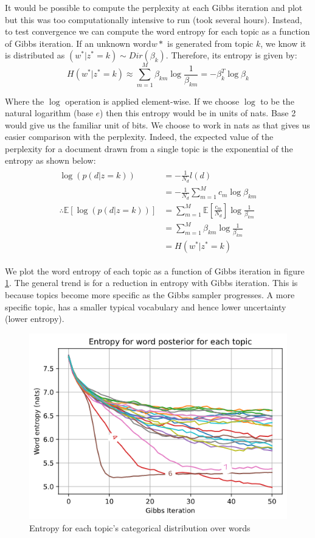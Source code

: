 \documentclass[]{article}
\newcommand{\figwidth}{0.4\linewidth}
\newcommand{\Expect}{\mathbb{E}}
\begin{document}
It would be possible to compute the perplexity at each Gibbs iteration and plot but this was too computationally intensive to run (took several hours). Instead, to test convergence we can compute the word entropy for each topic as a function of Gibbs iteration. If an unknown word$w*$ is generated from topic $k$, we know it is distributed as $(w^* | z^* = k) \sim Dir(\beta_k)$. Therefore, its entropy is given by:
%
\begin{equation}
	H(w^* | z^* = k) \approx \sum_{m=1}^{M} \beta_{km} \log \frac{1}{\beta_{km}} = - \beta_k^T \log \beta_k
\end{equation}

Where the $\log$ operation is applied element-wise. If we choose $\log$ to be the natural logarithm (base $e$) then this entropy would be in units of nats. Base 2 would give us the familiar unit of bits. We choose to work in nats as that gives us easier comparison with the perplexity. Indeed, the expected value of the perplexity for a document drawn from a single topic is the exponential of the entropy as shown below:
%
\begin{align}
\begin{split}
	\log(p(d|z=k)) &= - \frac{1}{N_d} l(d) \\
	&= - \frac{1}{N_d} \sum_{m=1}^{M} c_m \log \beta_{km} \\
	\therefore \Expect [\log(p(d|z=k))] &= \sum_{m=1}^{M} \Expect \left[ \frac{c_m}{N_d} \right] \log \frac{1}{\beta_{km}} \\
	&= \sum_{m=1}^{M} \beta_{km} \log \frac{1}{\beta_{km}} \\
	&= H(w^* | z^* = k)
\end{split}
\end{align}

We plot the word entropy of each topic as a function of Gibbs iteration in figure \ref{fig:word-entropy}. The general trend is for a reduction in entropy with Gibbs iteration. This is because topics become more specific as the Gibbs sampler progresses. A more specific topic, has a smaller typical vocabulary and hence lower uncertainty (lower entropy).
%
\begin{figure}[!h]
	\centering
	\includegraphics[width=\figwidth]{word-entropy.png}
	\caption{Entropy for each topic's categorical distribution over words}
	\label{fig:word-entropy}
\end{figure}
\end{document}
